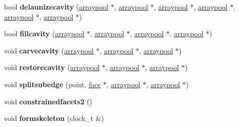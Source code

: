 \begin{DoxyCompactItemize}
\item 
\hypertarget{classtetgenmesh_ad8084ebb402b7a0d06303eda20ecae65}{bool {\bfseries delaunizecavity} (\hyperlink{classtetgenmesh_1_1arraypool}{arraypool} $\ast$, \hyperlink{classtetgenmesh_1_1arraypool}{arraypool} $\ast$, \hyperlink{classtetgenmesh_1_1arraypool}{arraypool} $\ast$, \hyperlink{classtetgenmesh_1_1arraypool}{arraypool} $\ast$, \hyperlink{classtetgenmesh_1_1arraypool}{arraypool} $\ast$, \hyperlink{classtetgenmesh_1_1arraypool}{arraypool} $\ast$)}\label{classtetgenmesh_ad8084ebb402b7a0d06303eda20ecae65}

\item 
\hypertarget{classtetgenmesh_a03633c0bdf34efd2fe127d7c07060af8}{bool {\bfseries fillcavity} (\hyperlink{classtetgenmesh_1_1arraypool}{arraypool} $\ast$, \hyperlink{classtetgenmesh_1_1arraypool}{arraypool} $\ast$, \hyperlink{classtetgenmesh_1_1arraypool}{arraypool} $\ast$, \hyperlink{classtetgenmesh_1_1arraypool}{arraypool} $\ast$)}\label{classtetgenmesh_a03633c0bdf34efd2fe127d7c07060af8}

\item 
\hypertarget{classtetgenmesh_a820c230ca5161419ee7d1d9a731a17af}{void {\bfseries carvecavity} (\hyperlink{classtetgenmesh_1_1arraypool}{arraypool} $\ast$, \hyperlink{classtetgenmesh_1_1arraypool}{arraypool} $\ast$, \hyperlink{classtetgenmesh_1_1arraypool}{arraypool} $\ast$)}\label{classtetgenmesh_a820c230ca5161419ee7d1d9a731a17af}

\item 
\hypertarget{classtetgenmesh_aa1697de5ddb0d46c145da0b7da97281c}{void {\bfseries restorecavity} (\hyperlink{classtetgenmesh_1_1arraypool}{arraypool} $\ast$, \hyperlink{classtetgenmesh_1_1arraypool}{arraypool} $\ast$, \hyperlink{classtetgenmesh_1_1arraypool}{arraypool} $\ast$)}\label{classtetgenmesh_aa1697de5ddb0d46c145da0b7da97281c}

\item 
\hypertarget{classtetgenmesh_ae528b2d5d3593a2174877b0f5c0efa99}{void {\bfseries splitsubedge} (point, \hyperlink{classtetgenmesh_1_1face}{face} $\ast$, \hyperlink{classtetgenmesh_1_1arraypool}{arraypool} $\ast$, \hyperlink{classtetgenmesh_1_1arraypool}{arraypool} $\ast$)}\label{classtetgenmesh_ae528b2d5d3593a2174877b0f5c0efa99}

\item 
\hypertarget{classtetgenmesh_a208deaf104d9af7b9c4fe706c2cdbc8f}{void {\bfseries constrainedfacets2} ()}\label{classtetgenmesh_a208deaf104d9af7b9c4fe706c2cdbc8f}

\item 
\hypertarget{classtetgenmesh_a89ab569cf101a8985d35eb1eb8781224}{void {\bfseries formskeleton} (clock\-\_\-t \&)}\label{classtetgenmesh_a89ab569cf101a8985d35eb1eb8781224}


\end{DoxyCompactItemize}
